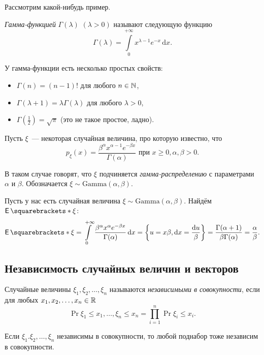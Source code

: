 Рассмотрим какой-нибудь пример.
\begin{definition}
	\emph{Гамма-функцией} \(\Gamma(\lambda)\) \((\lambda > 0)\) называют следующую функцию
	\[\Gamma(\lambda) = \int\limits_{0}^{+\infty} x^{\lambda - 1}e^{-x}\,\mathrm{d}x.\]
\end{definition}

У гамма-функции есть несколько простых свойств:
\begin{itemize}
	\item \(\Gamma(n) = (n - 1)!\) для любого \(n \in \mathbb{N}\),
	\item \(\Gamma(\lambda + 1) = \lambda\Gamma(\lambda)\) для любого \(\lambda > 0\),
	\item \(\Gamma\left(\frac{1}{2}\right) = \sqrt{\pi}\) (это не такое простое, ладно).
\end{itemize}

\begin{definition}
	Пусть \(\xi\)~--- некоторая случайная величина, про которую известно, что
	\[
	p_{\xi}(x) = \dfrac{\beta^{\alpha}x^{\alpha - 1}e^{-\beta x}}{\Gamma(\alpha)} \text{ при } x \geq 0, \alpha, \beta > 0.
	\]
	
	В таком случае говорят, что \(\xi\) подчиняется \emph{гамма-распределению} с параметрами \(\alpha\) и \(\beta\). Обозначается \(\xi \sim \mathrm{Gamma}(\alpha, \beta)\).
\end{definition}

Пусть у нас есть случайная величина \(\xi \sim \mathrm{Gamma}(\alpha, \beta)\). Найдём \(\E{\xi}\):
\[
\E{\xi} = \int\limits_{0}^{+\infty} \dfrac{\beta^{\alpha}x^{\alpha}e^{-\beta x}}{\Gamma(\alpha)}\diff x = \left\{u = x\beta, \diff x = \frac{\diff u}{\beta}\right\} = \frac{\Gamma(\alpha + 1)}{\beta\Gamma(\alpha)} = \frac{\alpha}{\beta}.
\]

\subsection{Независимость случайных величин и векторов}

\begin{definition}
	Случайные величины \(\xi_1, \xi_2, \dots, \xi_n\) называются \emph{независимыми в совокупности}, если для любых \(x_1, x_2, \dots, x_n \in \mathbb{R}\) 
	\[
	\Pr{\xi_1 \leq x_1, \dots, \xi_n \leq x_n} = \prod\limits_{i = 1}^{n} \Pr{\xi_i \leq x_i}.
	\] 
\end{definition}
\begin{remark}
	Если \(\xi_1. \xi_2, \dots, \xi_n\) независимы в совокупности, то любой поднабор тоже независим в совокупности.
\end{remark}

